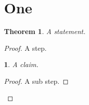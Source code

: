 \documentclass{article}
\newtheorem{thm}{Theorem}[section]
\newtheorem{stat}{}[thm]
\begin{document}
\section{One}
\begin{thm}
A statement.
\end{thm}
\begin{proof}
A step.
\begin{stat}
A claim.
\end{stat}
\begin{proof}
A sub step.
\end{proof}
\end{proof}
\end{document}
